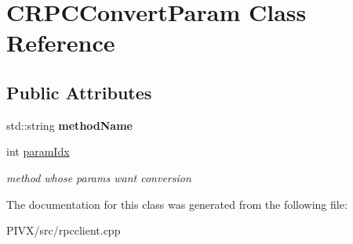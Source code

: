 \hypertarget{class_c_r_p_c_convert_param}{}\section{C\+R\+P\+C\+Convert\+Param Class Reference}
\label{class_c_r_p_c_convert_param}
\subsection*{Public Attributes}
\begin{DoxyCompactItemize}
\item 
\mbox{\label{class_c_r_p_c_convert_param_a072d6cde94ea57223445dee927ee1527}} 
std\+::string {\bfseries method\+Name}
\item 
\mbox{\label{class_c_r_p_c_convert_param_a3bd464f8d5db060616e7be8fbacb58f8}} 
int \mbox{\hyperlink{class_c_r_p_c_convert_param_a3bd464f8d5db060616e7be8fbacb58f8}{param\+Idx}}
\begin{DoxyCompactList}\small\item\em method whose params want conversion \end{DoxyCompactList}\end{DoxyCompactItemize}


The documentation for this class was generated from the following file\+:\begin{DoxyCompactItemize}
\item 
P\+I\+V\+X/src/rpcclient.\+cpp\end{DoxyCompactItemize}
